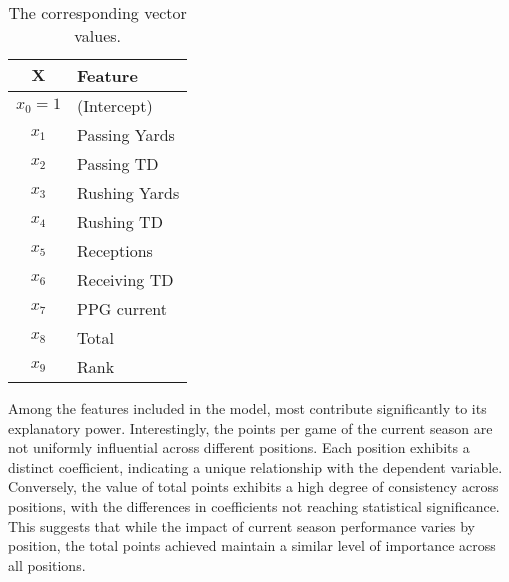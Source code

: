\begin{wraptable}{r}{4.5cm}
	\vspace{-5.25em}
	{\singlespacing
	\caption{The corresponding vector values.}
	\label{tab:coeff-key}
	\begin{tabular}{cl}
		\toprule
		$\mathbf{X}$ & Feature \\
		\midrule
		$x_0=1$ & (Intercept)    \\
		$x_1$ & Passing Yards   \\
		$x_2$ & Passing TD    \\
		$x_3$ & Rushing Yards   \\
		$x_4$ & Rushing TD   \\
		$x_5$ & Receptions   \\
		$x_6$ & Receiving TD    \\
		$x_{7}$ & PPG current    \\
		$x_{8}$ & Total     \\
		$x_{9}$ & Rank   \\
		\bottomrule 
	\end{tabular}}
\end{wraptable}

Among the features included in the model, most contribute significantly to its explanatory power. Interestingly, the points per game of the current season are not uniformly influential across different positions. Each position exhibits a distinct coefficient, indicating a unique relationship with the dependent variable. Conversely, the value of total points exhibits a high degree of consistency across positions, with the differences in coefficients not reaching statistical significance. This suggests that while the impact of current season performance varies by position, the total points achieved maintain a similar level of importance across all positions.






